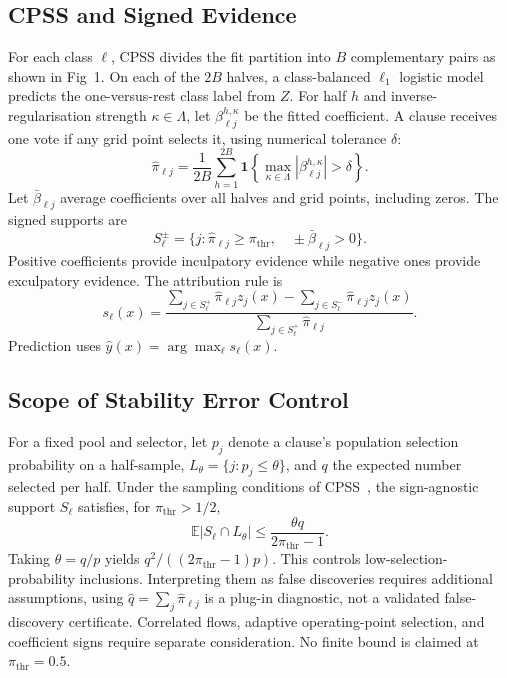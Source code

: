 \documentclass[conference]{IEEEtran}
\begin{document}
\subsection{CPSS and Signed Evidence}
\label{sec:cpss}
For each class $\ell$, CPSS divides the fit partition into $B$ complementary pairs as shown in Fig~1. On each of the $2B$ halves, a class-balanced
$\ell_1$ logistic model predicts the one-versus-rest class label from
$Z$. For half $h$ and inverse-regularisation strength
$\kappa\in\Lambda$, let $\beta_{\ell j}^{h,\kappa}$ be the fitted
coefficient. A clause receives one vote if any grid point selects it,
using numerical tolerance $\delta$:
\begin{equation}
 \hat\pi_{\ell j}=\frac{1}{2B}\sum_{h=1}^{2B}
 \mathbf1\!\left\{\max_{\kappa\in\Lambda}
             |\beta_{\ell j}^{h,\kappa}|>\delta\right\}.
 \label{eq:stability}
\end{equation}
Let $\bar\beta_{\ell j}$ average coefficients over all halves and grid points, including zeros. The signed supports are
\begin{equation}
 S_\ell^\pm=\{j:\hat\pi_{\ell j}\ge\pi_{\mathrm{thr}},\quad
                                  \pm\bar\beta_{\ell j}>0\}.
 \label{eq:sign}
\end{equation}
Positive coefficients provide inculpatory evidence while negative ones provide exculpatory evidence. The attribution rule is
\begin{equation}
 s_\ell(x)=\frac{\sum_{j\in S_\ell^+}\hat\pi_{\ell j}z_j(x)
                 -\sum_{j\in S_\ell^-}\hat\pi_{\ell j}z_j(x)}
                {\sum_{j\in S_\ell^+}\hat\pi_{\ell j}}.
 \label{eq:score}
\end{equation}
Prediction uses $\hat y(x)=\arg\max_\ell s_\ell(x)$.

\subsection{Scope of Stability Error Control}
\label{sec:cert}
For a fixed pool and selector, let $p_j$ denote a clause's population
selection probability on a half-sample, $L_\theta=\{j:p_j\le\theta\}$,
and $q$ the expected number selected per half. Under the sampling
conditions of CPSS~\cite{shah2013}, the sign-agnostic support $S_\ell$
satisfies, for $\pi_{\mathrm{thr}}>1/2$,
\begin{equation}
 \mathbb E|S_\ell\cap L_\theta|
 \le\frac{\theta q}{2\pi_{\mathrm{thr}}-1}.
 \label{eq:bound}
\end{equation}
Taking $\theta=q/p$ yields $q^2/((2\pi_{\mathrm{thr}}-1)p)$.
This controls low-selection-probability inclusions. Interpreting them as false discoveries requires additional assumptions, using
$\hat q=\sum_j\hat\pi_{\ell j}$ is a plug-in diagnostic, not a validated false-discovery certificate. Correlated flows, adaptive
operating-point selection, and coefficient signs require separate
consideration. No finite bound is claimed at $\pi_{\mathrm{thr}}=0.5$.
\end{document}
